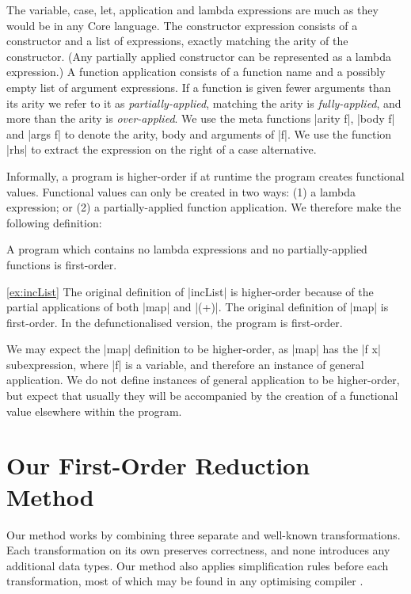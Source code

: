The variable, case, let, application and lambda expressions are much as they would be in any Core language. The constructor expression consists of a constructor and a list of expressions, exactly matching the arity of the constructor. (Any partially applied constructor can be represented as a lambda expression.) A function application consists of a function name and a possibly empty list of argument expressions. If a function is given fewer arguments than its arity we refer to it as \textit{partially-applied}, matching the arity is \textit{fully-applied}, and more than the arity is \textit{over-applied}. We use the meta functions |arity f|, |body f| and |args f| to denote the arity, body and arguments of |f|. We use the function |rhs| to extract the expression on the right of a case alternative.

Informally, a program is higher-order if at runtime the program creates functional values. Functional values can only be created in two ways: (1) a lambda expression; or (2) a partially-applied function application. We therefore make the following definition:

\begin{definition}
A program which contains no lambda expressions and no partially-applied functions is first-order.
\end{definition}

\begin{examplerevisit}{\ref{ex:incList}}
The original definition of |incList| is higher-order because of the partial applications of both |map| and |(+)|. The original definition of |map| is first-order. In the defunctionalised version, the program is first-order.
\end{examplerevisit}

We may expect the |map| definition to be higher-order, as |map| has the |f x| subexpression, where |f| is a variable, and therefore an instance of general application. We do not define instances of general application to be higher-order, but expect that usually they will be accompanied by the creation of a functional value elsewhere within the program.

\section{Our First-Order Reduction Method}
\label{sec:overview}

Our method works by combining three separate and well-known transformations. Each transformation on its own preserves correctness, and none introduces any additional data types. Our method also applies simplification rules before each transformation, most of which may be found in any optimising compiler \cite{spj:transformation}.

